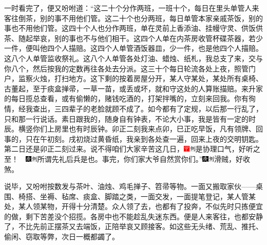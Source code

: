 一时看完了，便又吩咐道：“这二十个分作两班，一班十个，每日在里头单管人来客往倒茶，别的事不用他们管。这二十个也分两班，每日单管本家亲戚茶饭，别的事也不用他们管。这四十个人也分作两班，单在灵前上香添油、挂幔守灵、供饭供茶、随起举哀，别的事也不与他们相干。这四个人单在内茶房收管杯碟茶器，若少一件，便叫他四个人描赔。这四个人单管酒饭器皿，少一件，也是他四个人描赔。这八个人单管监收祭礼。这八个人单管各处灯油、蜡烛、纸札，我总支了来，交与你八个，然后按我的定数再往各处去分派。这三十个每日轮流各处上夜，照管门户，监察火烛，打扫地方。这下剩的按着房屋分开，某人守某处，某处所有桌椅、古董起，至于痰盒掸帚，一草一苗，或丢或坏，就和守这处的人算账描赔。来升家的每日揽总查看，或有偷懒的，赌钱吃酒的，打架拌嘴的，立刻来回我。你有徇情，经我查出，三四辈子的老脸就顾不成了。如今都有了定规，以后那一行乱了，只和那一行说话。素日跟我的，随身自有钟表，不论大小事，我是皆有一定的时辰。横竖你们上房里也有时辰钟。卯正二刻我来点卯，巳正吃早饭，凡有领牌、回事的，只在午初刻。戌初烧过黄昏纸，我亲到各处查一遍，回来上夜的交明钥匙。第二日还是卯正二刻过来。说不得咱们大家辛苦这几日，{\includegraphics[width=3mm]{../Images/00002}\includegraphics[width=3mm]{../Images/00011}\footnotesize \kaishu 是协理口气，好听之至！　\includegraphics[width=3mm]{../Images/00004}\includegraphics[width=3mm]{../Images/00011}\footnotesize \kaishu 所谓先礼后兵是也。}事完，你们家大爷自然赏你们。”{\includegraphics[width=3mm]{../Images/00004}\includegraphics[width=3mm]{../Images/00011}\footnotesize \kaishu 滑贼，好收煞。}

说毕，又吩咐按数发与茶叶、油烛、鸡毛掸子、笤帚等物。一面又搬取家伙------桌围、椅搭、坐褥、毡席、痰盒、脚踏之类，一面交发，一面提笔登记，某人管某处，某人领某物，开得十分清楚。众人领了去，也都有了投奔，不似先时只拣便宜的做，剩下苦差没个招揽。各房中也不能趁乱失迷东西。便是人来客往，也都安静了，不比先前正摆茶又去端饭，正陪举哀又顾接客。如这些无头绪、荒乱、推托、偷闲、窃取等弊，次日一概都蠲了。

